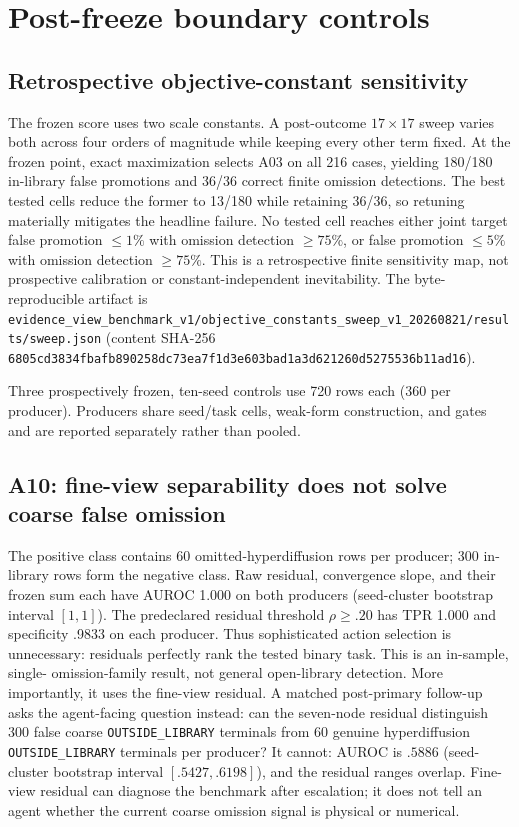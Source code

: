 \documentclass{article}
\newcommand{\OUT}{\texttt{OUTSIDE\_LIBRARY}\xspace}
\begin{document}
\section{Post-freeze boundary controls}
\label{sec:boundary-controls}

\subsection{Retrospective objective-constant sensitivity}
The frozen score uses two scale constants. A post-outcome $17\times17$ sweep varies both across four
orders of magnitude while keeping every other term fixed. At the frozen point, exact maximization
selects A03 on all 216 cases, yielding 180/180 in-library false promotions and 36/36 correct finite
omission detections. The best tested cells reduce the former to 13/180 while retaining 36/36, so
retuning materially mitigates the headline failure. No tested cell reaches either joint target
false promotion $\le1\%$ with omission detection $\ge75\%$, or false promotion $\le5\%$ with
omission detection $\ge75\%$. This is a retrospective finite sensitivity map, not prospective
calibration or constant-independent inevitability. The byte-reproducible artifact is
\nolinkurl{evidence_view_benchmark_v1/objective_constants_sweep_v1_20260821/results/sweep.json}
(content SHA-256
\nolinkurl{6805cd3834fbafb890258dc73ea7f1d3e603bad1a3d621260d5275536b11ad16}).

Three prospectively frozen, ten-seed controls use 720 rows each (360 per producer). Producers share
seed/task cells, weak-form construction, and gates and are reported separately rather than pooled.

\subsection{A10: fine-view separability does not solve coarse false omission}

The positive class contains 60 omitted-hyperdiffusion rows per producer; 300 in-library rows form
the negative class. Raw residual, convergence slope, and their frozen sum each have AUROC 1.000 on
both producers (seed-cluster bootstrap interval $[1,1]$). The predeclared residual threshold
$\rho\ge .20$ has TPR 1.000 and specificity .9833 on each producer. Thus sophisticated action
selection is unnecessary: residuals perfectly rank the tested binary task. This is an in-sample, single-
omission-family result, not general open-library detection. More importantly, it uses the fine-view
residual. A matched post-primary follow-up asks the agent-facing question instead: can the
seven-node residual distinguish 300 false coarse \OUT terminals from 60 genuine hyperdiffusion
\OUT terminals per producer? It cannot: AUROC is $.5886$ (seed-cluster bootstrap interval
$[.5427,.6198]$), and the residual ranges overlap. Fine-view residual can diagnose the benchmark
after escalation; it does not tell an agent whether the current coarse omission signal is physical
or numerical.
\end{document}
